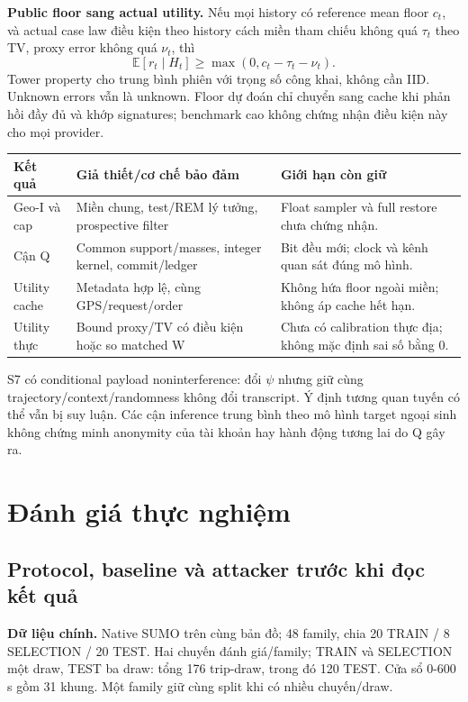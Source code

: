 \documentclass[10pt,a4paper]{article}
\begin{document}
\textbf{Public floor sang actual utility.} Nếu mọi history có reference mean floor $c_t$, và actual case law
điều kiện theo history cách miền tham chiếu không quá $\tau_t$ theo TV, proxy error không quá $\nu_t$, thì
\begin{equation}
\mathbb E[r_t\mid H_t]\ge\max(0,c_t-\tau_t-\nu_t).
\label{eq:transfer}
\end{equation}
Tower property cho trung bình phiên với trọng số công khai, không cần IID. Unknown errors vẫn là unknown.
Floor dự đoán chỉ chuyển sang cache khi phản hồi đầy đủ và khớp signatures; benchmark cao không chứng nhận điều kiện này cho mọi provider.

\begin{tabularx}{\linewidth}{@{}P{3cm}P{5.4cm}Y@{}}\toprule
\textbf{Kết quả} & \textbf{Giả thiết/cơ chế bảo đảm} & \textbf{Giới hạn còn giữ}\\\midrule
Geo-I và cap & Miền chung, test/REM lý tưởng, prospective filter & Float sampler và full restore chưa chứng nhận.\\
Cận Q & Common support/masses, integer kernel, commit/ledger & Bit đều mới; clock và kênh quan sát đúng mô hình.\\
Utility cache & Metadata hợp lệ, cùng GPS/request/order & Không hứa floor ngoài miền; không áp cache hết hạn.\\
Utility thực & Bound proxy/TV có điều kiện hoặc so matched W & Chưa có calibration thực địa; không mặc định sai số bằng 0.\\\bottomrule
\end{tabularx}
S7 có conditional payload noninterference: đổi $\psi$ nhưng giữ cùng trajectory/context/randomness không đổi transcript.
Ý định tương quan tuyến có thể vẫn bị suy luận. Các cận inference trung bình theo mô hình target ngoại sinh
không chứng minh anonymity của tài khoản hay hành động tương lai do Q gây ra.

\clearpage
\section{Đánh giá thực nghiệm}
\subsection{Protocol, baseline và attacker trước khi đọc kết quả}
\textbf{Dữ liệu chính.} Native SUMO trên cùng bản đồ; 48 family, chia 20 TRAIN / 8 SELECTION / 20 TEST.
Hai chuyến đánh giá/family; TRAIN và SELECTION một draw, TEST ba draw: tổng 176 trip-draw, trong đó
120 TEST. Cửa sổ 0-600 s gồm 31 khung. Một family giữ cùng split khi có nhiều chuyến/draw.
\end{document}
